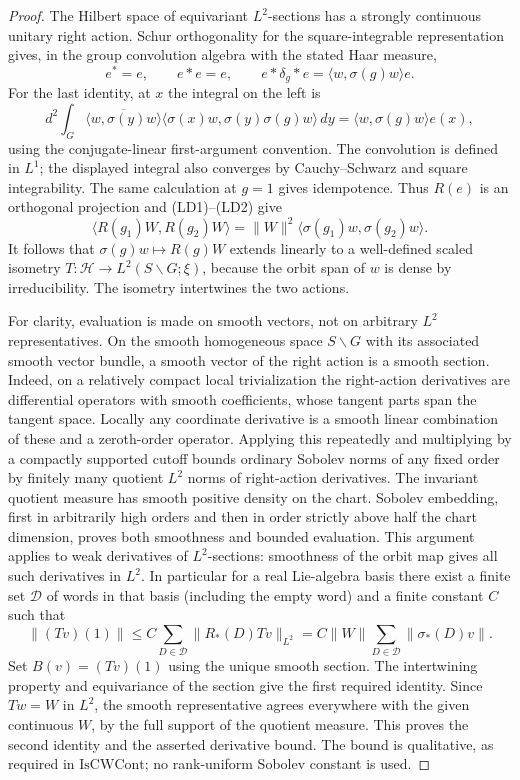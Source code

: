 \begin{proof}
The Hilbert space of equivariant \(L^2\)-sections has a strongly
continuous unitary right action. Schur orthogonality for the
square-integrable representation gives, in the group
convolution algebra with the stated Haar measure,
\[
 e^*=e,\qquad e*e=e,\qquad
 e*\delta_g*e=\langle w,\sigma(g)w\rangle e.
 \tag{LD2}
\]
For the last identity, at \(x\) the integral on the left is
\[
 d^2\int_G
 \overline{\langle w,\sigma(y)w\rangle}
 \langle \sigma(x)w,\sigma(y)\sigma(g)w\rangle\,dy
   =\langle w,\sigma(g)w\rangle e(x),
\]
using the conjugate-linear first-argument convention.
The convolution is defined in \(L^1\); the displayed integral
also converges by Cauchy--Schwarz and square integrability.
The same calculation at \(g=1\) gives idempotence.
Thus \(R(e)\) is an orthogonal projection and (LD1)--(LD2)
give
\[
 \langle R(g_1)W,R(g_2)W\rangle
   =\|W\|^2\langle \sigma(g_1)w,\sigma(g_2)w\rangle .
\]
It follows that
\(\sigma(g)w\mapsto R(g)W\) extends linearly to a
well-defined scaled isometry \(T:\mathcal H\to L^2(S\backslash
G;\xi)\), because the orbit span of \(w\) is dense by
irreducibility. The isometry intertwines the two actions.

For clarity, evaluation is made on smooth vectors, not on
arbitrary \(L^2\) representatives. On the smooth homogeneous
space \(S\backslash G\) with its associated smooth vector bundle,
a smooth vector of the right action is a smooth section.
Indeed, on a relatively compact local trivialization the
right-action derivatives are differential operators with
smooth coefficients, whose tangent parts span the tangent
space. Locally any coordinate derivative is a smooth
linear combination of these and a zeroth-order operator.
Applying this repeatedly and multiplying by a compactly
supported cutoff bounds ordinary Sobolev norms of any fixed
order by finitely many quotient \(L^2\) norms of right-action
derivatives. The invariant quotient measure has smooth positive
density on the chart. Sobolev embedding, first in arbitrarily
high orders and then in order strictly above half the chart
dimension, proves both smoothness and bounded evaluation.
This argument applies to weak derivatives of \(L^2\)-sections:
smoothness of the orbit map gives all such derivatives in
\(L^2\). In particular for a real Lie-algebra basis there
exist a finite set \(\mathcal D\) of words in that basis
(including the empty word) and a finite constant \(C\) such
that
\[
 \|(Tv)(1)\|\le C\sum_{D\in\mathcal D}
            \|R_*(D)Tv\|_{L^2}
       = C\|W\|\sum_{D\in\mathcal D}\|\sigma_*(D)v\|.
\]
Set \(B(v)=(Tv)(1)\) using the unique smooth section.
The intertwining property and equivariance of the section
give the first required identity. Since \(Tw=W\) in \(L^2\),
the smooth representative agrees everywhere with the
given continuous \(W\), by the full support of the quotient
measure. This proves the second identity and the asserted
derivative bound. The bound is qualitative, as required
in \(\mathrm{IsCWCont}\); no rank-uniform Sobolev constant
is used.
\end{proof}

